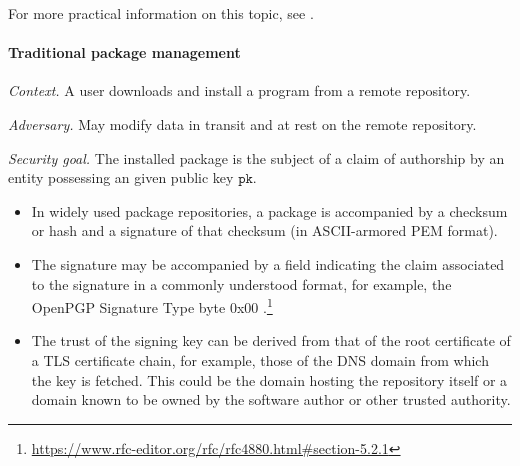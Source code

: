 For more practical information on this topic, see \cite{timesys2023securing}.

\hypertarget{traditional-package-management}{%
\paragraph{Traditional package
management}\label{traditional-package-management}}

\emph{Context.} A user downloads and install a program from a remote
repository.

\emph{Adversary.} May modify data in transit and at rest on the remote
repository.

\emph{Security goal.} The installed package is the subject of a claim of
authorship by an entity possessing an given public key \(\mathtt{pk}\).

\begin{itemize}
\tightlist
\item
  In widely used package repositories, a package is accompanied by a checksum or hash and a signature of that checksum (in ASCII-armored PEM format).
\item
  The signature may be accompanied by a field indicating the claim associated to the signature in a commonly understood format, for example, the OpenPGP Signature Type byte 0x00 \cite[\S5.2.1]{rfc4880}.\footnote{\url{https://www.rfc-editor.org/rfc/rfc4880.html\#section-5.2.1}}
\item
  The trust of the signing key can be derived from that of the root
  certificate of a TLS certificate chain, for example, those of the DNS
  domain from which the key is fetched. This could be the domain hosting
  the repository itself or a domain known to be owned by the software
  author or other trusted authority.
\end{itemize}

\printbibliography